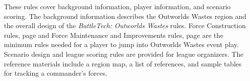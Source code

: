These rules cover background information, player information, and scenario scoring.
The background information describes the Outworlds Wastes region and the overall design of the \emph{BattleTech: Outworlds Wastes} rules.
Force Construction rules, page \pageref{subsec:force_construction} and Force Maintenance and Improvements rules, page \pageref{subsec:force_maintenance} are the minimum rules needed for a player to jump into Outworlds Wastes event play.
Scenario design and league scoring rules are provided for league organizers.
The reference materials include a region map, a list of references, and sample tables for tracking a commander's forces.
